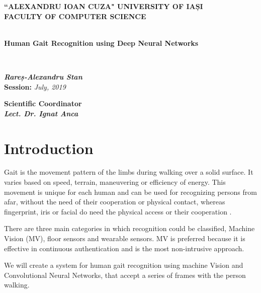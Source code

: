 \documentclass[12pt]{article}
\theoremstyle{definition}
\begin{document}
	\begin{titlepage}
		\begin{center}
			\textbf{``ALEXANDRU IOAN CUZA" UNIVERSITY OF IAȘI}
			\
			\\
			\textbf{FACULTY OF COMPUTER SCIENCE}\\
			\vspace{6cm}
			\
			\\
			\begin{huge}
				\textbf{Human Gait Recognition using Deep Neural Networks}
			\end{huge}
			\\
			\begin{large}
				\vspace{3cm}
				\textit{\textbf{Rareș-Alexandru Stan}}
				\\
				\vspace{3cm}
				\textbf{Session:} \textit{July, 2019}
				\\
			\end{large}
			\vspace{3cm}
			\textbf{Scientific Coordinator}
			\
			\\
			\textit{\textbf{Lect. Dr. Ignat Anca}	}
		\end{center}
	\end{titlepage}

	\clearpage
	\tableofcontents
	\clearpage

	\section{Introduction}
	\vspace{1cm}

	Gait is the movement pattern of the limbs during walking over a solid surface. It varies based on speed, terrain, maneuvering or efficiency of energy. This movement is unique for each human and can be used for recognizing persons from afar, without the need of their cooperation or physical contact, whereas fingerprint, iris or facial do need the physical access or their cooperation \cite{biometrics-comparison}.

	There are three main categories in which recognition could be classified, Machine Vision (MV), floor sensors and wearable sensors. MV is preferred because it is effective in continuous authentication and is the most non-intrusive approach.

	We will create a system for human gait recognition using machine Vision and Convolutional Neural Networks, that accept a series of frames with the person walking.
\end{document}
